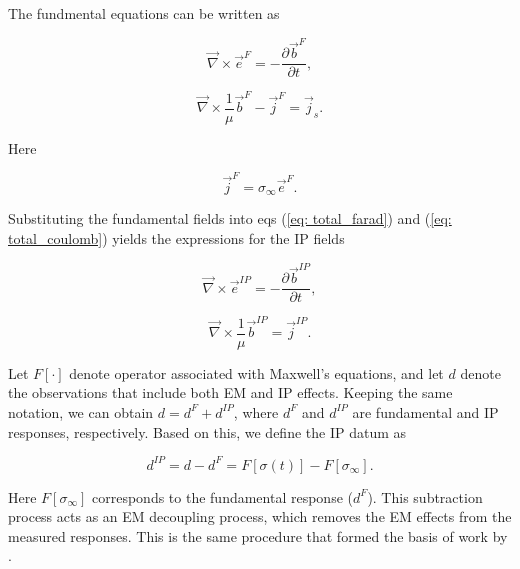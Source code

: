 \documentclass[extra,mreferee]{gji}
\newcommand{\curl}{{\vec \nabla}\times}
\newcommand{\siginf}{\sigma_\infty}
\renewcommand {\j}  { {\vec j} }
\renewcommand {\b}  { {\vec b} }
\newcommand {\e}  { {\vec e} }
\newcommand{\dip}{d^{IP}}
\begin{document}
The fundmental equations can be written as
\begin{linenomath*}
\begin{equation}
  \curl \e^{F} = -\frac{\partial \b^{F}}{\partial t},
  \label{eq: eq_primary_farad}
\end{equation}
\end{linenomath*}
\begin{linenomath*}
\begin{equation}
  \curl{\frac{1}{\mu}\b^{F}} -\j^{F} = \j_s.
  \label{eq: eq_primary_coulomb}
\end{equation}
\end{linenomath*}
Here
\begin{linenomath*}
\begin{equation}
  \j^{F} = \siginf\e^{F}.
  \label{eq: jF}
\end{equation}
\end{linenomath*}

Substituting the fundamental fields into eqs (\ref{eq: total_farad}) and (\ref{eq: total_coulomb}) yields the expressions for the IP fields 
\begin{linenomath*}
\begin{equation}
  \curl \e^{IP} = -\frac{\partial \b^{IP}}{\partial t},
  \label{eq: eq_secondary_farad}
\end{equation}
\end{linenomath*}
\begin{linenomath*}
\begin{equation}
  \curl{\frac{1}{\mu}\b^{IP}} = \j^{IP}.
  \label{eq: eq_secondary_coulomb}
\end{equation}
\end{linenomath*}

Let $F[\cdot]$ denote operator associated with Maxwell’s equations, and let $d$ denote the observations that include both EM and IP effects. 
Keeping the same notation, we can obtain $d = d^{F} + \dip$, where $d^F$ and $\dip$ are fundamental and IP responses, respectively. 
Based on this, we define the IP datum as 
\begin{linenomath*}
\begin{equation}
  \dip = d - d^{F} = F[\sigma(t)]-F[\siginf].
    \label{eq: IPdatum_syn}
\end{equation}
\end{linenomath*}
Here $F[\siginf]$ corresponds to the fundamental response ($d^F$). 
This subtraction process acts as an EM decoupling process, which removes the EM effects from the measured responses. This is the same procedure that formed the basis of work by \cite{routh2001}. 
\end{document}
